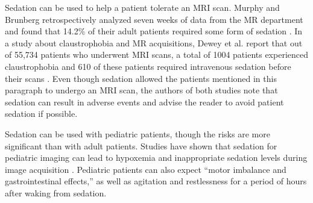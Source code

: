 Sedation can be used to help a patient tolerate an MRI scan. Murphy and Brunberg retrospectively analyzed seven weeks of data from the MR department and found that 14.2\% of their adult patients required some form of sedation \cite{Murphy1997}. In a study about claustrophobia and MR acquisitions, Dewey et al. report that out of 55,734 patients who underwent MRI scans, a total of 1004 patients experienced claustrophobia and 610 of these patients required intravenous sedation before their scans \cite{Dewey2007}. Even though sedation allowed the patients mentioned in this paragraph to undergo an MRI scan, the authors of both studies note that sedation can result in adverse events and advise the reader to avoid patient sedation if possible.

Sedation can be used with pediatric patients, though the risks are more significant than with adult patients. Studies have shown that sedation for pediatric imaging can lead to hypoxemia and inappropriate sedation levels during image acquisition \cite{Malviya2000}. Pediatric patients can also expect ``motor imbalance and gastrointestinal effects,'' as well as agitation and restlessness for a period of hours after waking from sedation.

